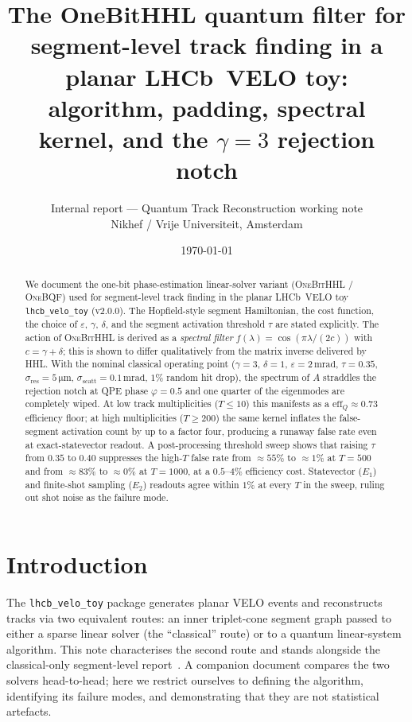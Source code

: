 \documentclass[11pt,a4paper]{article}
\title{The OneBitHHL quantum filter for segment-level track finding in a planar LHCb~VELO toy:\\
algorithm, padding, spectral kernel, and the $\gamma=3$ rejection notch}
\author{Internal report --- Quantum Track Reconstruction working note\\
\small Nikhef / Vrije Universiteit, Amsterdam}
\date{\today}
\newcommand{\eff}{\mathrm{eff}}
\begin{document}
\maketitle

\begin{abstract}
We document the one-bit phase-estimation linear-solver variant (\textsc{OneBitHHL} /
\textsc{OneBQF}) used for segment-level track finding in the planar LHCb~VELO toy
\texttt{lhcb\_velo\_toy} (v2.0.0). The Hopfield-style segment Hamiltonian, the cost
function, the choice of $\varepsilon$, $\gamma$, $\delta$, and the segment activation
threshold $\tau$ are stated explicitly. The action of \textsc{OneBitHHL} is derived as a
\emph{spectral filter} $f(\lambda) = \cos(\pi\lambda/(2c))$ with $c = \gamma + \delta$;
this is shown to differ qualitatively from the matrix inverse delivered by HHL. With the
nominal classical operating point ($\gamma=3$, $\delta=1$, $\varepsilon = 2\,\mathrm{mrad}$,
$\tau = 0.35$, $\sigma_{\mathrm{res}} = 5\,\mathrm{\mu m}$, $\sigma_{\mathrm{scatt}} =
0.1\,\mathrm{mrad}$, $1\%$ random hit drop), the spectrum of $A$ straddles the rejection
notch at QPE phase $\varphi = 0.5$ and one quarter of the eigenmodes are completely
wiped. At low track multiplicities ($T \le 10$) this manifests as a $\eff_Q
\approx 0.73$ efficiency floor; at high multiplicities ($T \ge 200$) the same kernel
inflates the false-segment activation count by up to a factor four, producing a
runaway false rate even at exact-statevector readout. A post-processing threshold sweep
shows that raising $\tau$ from $0.35$ to $0.40$ suppresses the high-$T$ false rate from
$\approx 55\%$ to $\approx 1\%$ at $T = 500$ and from $\approx 83\%$ to $\approx 0\%$ at
$T = 1000$, at a $0.5\text{--}4\%$ efficiency cost. Statevector ($E_1$) and finite-shot
sampling ($E_2$) readouts agree within $1\%$ at every $T$ in the sweep, ruling out
shot noise as the failure mode.
\end{abstract}

\section{Introduction}
\label{sec:intro}
The \texttt{lhcb\_velo\_toy} package generates planar VELO events and reconstructs tracks
via two equivalent routes: an inner triplet-cone segment graph passed to either a sparse
linear solver (the ``classical'' route) or to a quantum linear-system algorithm. This
note characterises the second route and stands alongside the classical-only segment-level
report~\cite{velo_toy}. A companion document compares the two solvers head-to-head; here
we restrict ourselves to defining the algorithm, identifying its failure modes, and
demonstrating that they are not statistical artefacts.
\end{document}
